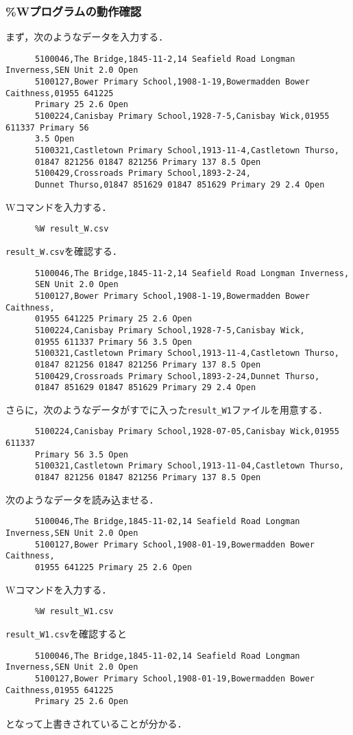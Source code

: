     \subsubsection{\%Wプログラムの動作確認}
    まず，次のようなデータを入力する．
    \begin{verbatim}
      5100046,The Bridge,1845-11-2,14 Seafield Road Longman Inverness,SEN Unit 2.0 Open
      5100127,Bower Primary School,1908-1-19,Bowermadden Bower Caithness,01955 641225
      Primary 25 2.6 Open
      5100224,Canisbay Primary School,1928-7-5,Canisbay Wick,01955 611337 Primary 56 
      3.5 Open
      5100321,Castletown Primary School,1913-11-4,Castletown Thurso,
      01847 821256 01847 821256 Primary 137 8.5 Open
      5100429,Crossroads Primary School,1893-2-24,
      Dunnet Thurso,01847 851629 01847 851629 Primary 29 2.4 Open
    \end{verbatim}
    Wコマンドを入力する．
    \begin{verbatim}
      %W result_W.csv
    \end{verbatim}
    \texttt{result\_W.csv}を確認する．
    \begin{verbatim}
      5100046,The Bridge,1845-11-2,14 Seafield Road Longman Inverness,
      SEN Unit 2.0 Open
      5100127,Bower Primary School,1908-1-19,Bowermadden Bower Caithness,
      01955 641225 Primary 25 2.6 Open
      5100224,Canisbay Primary School,1928-7-5,Canisbay Wick,
      01955 611337 Primary 56 3.5 Open
      5100321,Castletown Primary School,1913-11-4,Castletown Thurso,
      01847 821256 01847 821256 Primary 137 8.5 Open
      5100429,Crossroads Primary School,1893-2-24,Dunnet Thurso,
      01847 851629 01847 851629 Primary 29 2.4 Open
    \end{verbatim}
    さらに，次のようなデータがすでに入った\texttt{result\_W1}ファイルを用意する．
    \begin{verbatim}
      5100224,Canisbay Primary School,1928-07-05,Canisbay Wick,01955 611337 
      Primary 56 3.5 Open
      5100321,Castletown Primary School,1913-11-04,Castletown Thurso,
      01847 821256 01847 821256 Primary 137 8.5 Open
    \end{verbatim}
    次のようなデータを読み込ませる．
    \begin{verbatim}
      5100046,The Bridge,1845-11-02,14 Seafield Road Longman Inverness,SEN Unit 2.0 Open
      5100127,Bower Primary School,1908-01-19,Bowermadden Bower Caithness,
      01955 641225 Primary 25 2.6 Open
    \end{verbatim}
    Wコマンドを入力する．
    \begin{verbatim}
      %W result_W1.csv
    \end{verbatim}
    \texttt{result\_W1.csv}を確認すると
    \begin{verbatim}
      5100046,The Bridge,1845-11-02,14 Seafield Road Longman Inverness,SEN Unit 2.0 Open
      5100127,Bower Primary School,1908-01-19,Bowermadden Bower Caithness,01955 641225
      Primary 25 2.6 Open
    \end{verbatim}
    となって上書きされていることが分かる．
    

